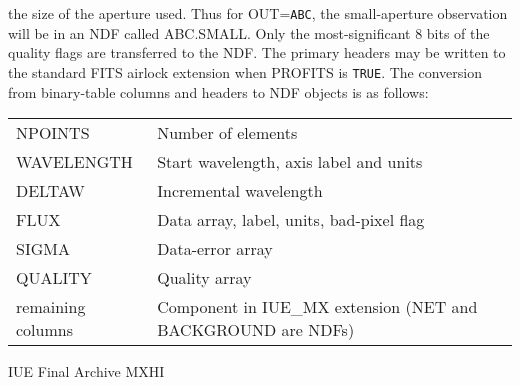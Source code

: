\documentclass[twoside,11pt]{starlink}
\begin{document}
{{{{            the size of the aperture used.  Thus for OUT=\texttt{ABC}, the
            small-aperture observation will be in an NDF called ABC.SMALL.
            \sstitem
            Only the most-significant 8 bits of the quality flags are
            transferred to the NDF.
            \sstitem
            The primary headers may be written to the standard FITS
            airlock extension when PROFITS is \texttt{TRUE}.
            \sstitem
            The conversion from binary-table columns and headers to NDF
            objects is as follows:
            \\[\medskipamount]
            \begin{tabular}{lp{90mm}}
            NPOINTS            &   Number of elements \\
            WAVELENGTH         &   Start wavelength, axis label and units \\
            DELTAW             &   Incremental wavelength \\
            FLUX               &   Data array, label, units, bad-pixel flag \\
            SIGMA              &   Data-error array \\
            QUALITY            &   Quality array \\
            remaining columns  &   Component in IUE\_MX extension (NET and
                                   BACKGROUND are NDFs) \\
            \end{tabular}
         }
         \bigskip
         \sstitem
         IUE Final Archive MXHI
         }}}
\end{document}
